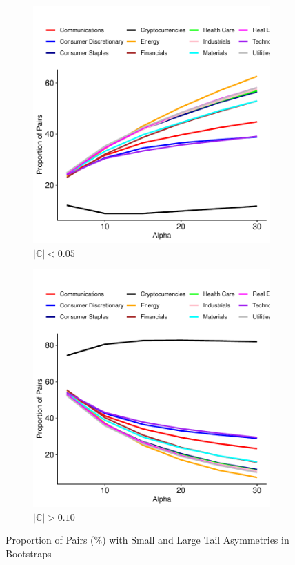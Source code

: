 \documentclass{article}
\begin{document}
\begin{figure}[H]
    \centering
    \begin{subfigure}[b]{0.45\textwidth}  %
        \includegraphics[width=\textwidth]{Figures/CQCD_5.pdf}
        \caption{$\big\lvert\mathbb{C}\big\rvert < 0.05$}
        \label{fig:boot2-sub1}
    \end{subfigure}
    \begin{subfigure}[b]{0.45\textwidth}
        \includegraphics[width=\textwidth]{Figures/CQCD_10.pdf}
       \caption{$\big\lvert\mathbb{C}\big\rvert > 0.10$}
        \label{fig:boot2-sub2}
    \end{subfigure}
    \caption{Proportion of Pairs (\%) with Small and Large Tail Asymmetries in Bootstraps}
    \label{fig:boot2}
\end{figure}
\end{document}
